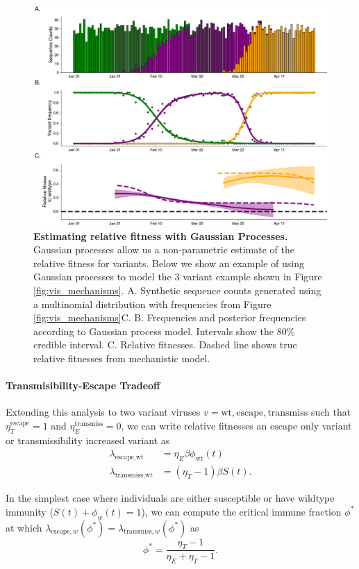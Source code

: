 \documentclass[12pt,oneside,letterpaper]{article}
\newcommand{\wt}{\text{wt}}
\newcommand{\varE}{\text{escape}}
\newcommand{\varT}{\text{transmiss}}
\begin{document}
\begin{figure}[h]
    \centering
    \includegraphics[width=0.8\linewidth]{./figures/gp_example.png}
    \caption{\textbf{Estimating relative fitness with Gaussian Processes.}
    Gaussian processes allow us a non-parametric estimate of the relative fitness for variants.
    Below we show an example of using Gaussian processes to model the 3 variant example shown in Figure \ref{fig:vis_mechanisms}.
    A. Synthetic sequence counts generated using a multinomial distribution with frequencies from Figure \ref{fig:vis_mechanisms}C.
    B. Frequencies and posterior frequencies according to Gaussian process model. Intervals show the 80\% credible interval.
    C. Relative fitnesses. Dashed line shows true relative fitnesses from mechanistic model.
}
    \label{fig:gp_example}
\end{figure}


\paragraph{Transmisibility-Escape Tradeoff}%

Extending this analysis to two variant viruses $v= \wt, \varE, \varT$ such that $\eta_{T}^{\varE} = 1$ and $\eta_{E}^{\varT} = 0$, we can write relative fitnesses an escape only variant or transmissibility increased variant as
\begin{align*}
    \lambda_{\varE, \wt} &= \eta_{E} \beta \phi_{\wt}(t)\\
    \lambda_{\varT, \wt} &= (\eta_{T} - 1) \beta S(t).
\end{align*}

In the simplest case where individuals are either susceptible or have wildtype immunity ($S(t) + \phi_{w}(t) = 1$), we can compute the critical immune fraction $\phi^{*}$ at which $\lambda_{\varE, w}(\phi^{*}) = \lambda_{\varT, w}(\phi^{*})$ as
\begin{equation} \label{eq:critical_immunity}
    \phi^{*} = \frac{\eta_{T} - 1}{\eta_{E} + \eta_{T} - 1}.
\end{equation}
\end{document}

